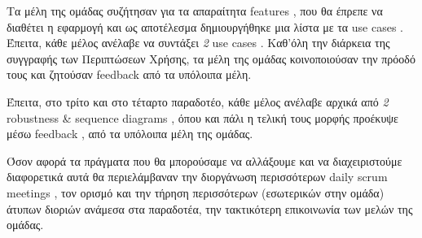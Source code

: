 \documentclass{../ol-softwaremanual}
\begin{document}
	Τα μέλη της ομάδας συζήτησαν για τα απαραίτητα \en features \gr, που θα έπρεπε να διαθέτει η εφαρμογή και ως αποτέλεσμα δημιουργήθηκε μια λίστα με τα \en use cases \gr. Έπειτα, κάθε μέλος ανέλαβε να συντάξει \textit{2} \en use cases \gr. Καθ'όλη την διάρκεια της συγγραφής των Περιπτώσεων Χρήσης, τα μέλη της ομάδας κοινοποιούσαν την πρόοδό τους και ζητούσαν \en feedback \gr από τα υπόλοιπα μέλη. \break
	
	Έπειτα, στο τρίτο και στο τέταρτο παραδοτέο, κάθε μέλος ανέλαβε αρχικά από \textit{2} \en robustness \& sequence diagrams \gr, όπου και πάλι η τελική τους μορφής προέκυψε μέσω \en feedback \gr, από τα υπόλοιπα μέλη της ομάδας. \break
	
	Όσον αφορά τα πράγματα που θα μπορούσαμε να αλλάξουμε και να διαχειριστούμε διαφορετικά αυτά θα περιελάμβαναν την διοργάνωση περισσότερων \en daily scrum meetings \gr, τον ορισμό και την τήρηση περισσότερων (εσωτερικών στην ομάδα) άτυπων διοριών ανάμεσα στα παραδοτέα, την τακτικότερη επικοινωνία των μελών της ομάδας.
\end{document}

